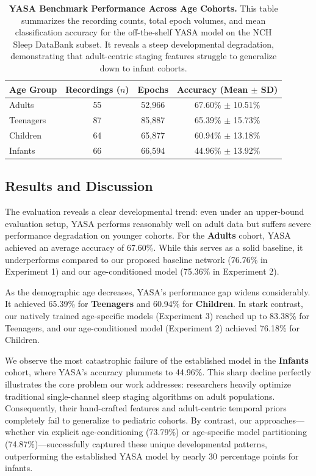 \begin{table}[ht]
\centering
\caption{\textbf{YASA Benchmark Performance Across Age Cohorts.} This table summarizes the recording counts, total epoch volumes, and mean classification accuracy for the off-the-shelf YASA model on the NCH Sleep DataBank subset. It reveals a steep developmental degradation, demonstrating that adult-centric staging features struggle to generalize down to infant cohorts.}
\label{tab:yasa_results}
\begin{tabular}{l c c c}
\toprule
\textbf{Age Group} & \textbf{Recordings ($n$)} & \textbf{Epochs} & \textbf{Accuracy (Mean $\pm$ SD)} \\
\midrule
Adults    & 55 & 52,966 & 67.60\% $\pm$ 10.51\% \\
Teenagers & 87 & 85,887 & 65.39\% $\pm$ 15.73\% \\
Children  & 64 & 65,877 & 60.94\% $\pm$ 13.18\% \\
Infants   & 66 & 66,594 & 44.96\% $\pm$ 13.92\% \\
\bottomrule
\end{tabular}
\end{table}

\subsection{Results and Discussion}
The evaluation reveals a clear developmental trend: even under an upper-bound evaluation setup, YASA performs reasonably well on adult data but suffers severe performance degradation on younger cohorts. For the \textbf{Adults} cohort, YASA achieved an average accuracy of 67.60\%. While this serves as a solid baseline, it underperforms compared to our proposed baseline network (76.76\% in Experiment 1) and our age-conditioned model (75.36\% in Experiment 2). 

As the demographic age decreases, YASA's performance gap widens considerably. It achieved 65.39\% for \textbf{Teenagers} and 60.94\% for \textbf{Children}. In stark contrast, our natively trained age-specific models (Experiment 3) reached up to 83.38\% for Teenagers, and our age-conditioned model (Experiment 2) achieved 76.18\% for Children.

We observe the most catastrophic failure of the established model in the \textbf{Infants} cohort, where YASA's accuracy plummets to 44.96\%. This sharp decline perfectly illustrates the core problem our work addresses: researchers heavily optimize traditional single-channel sleep staging algorithms on adult populations. Consequently, their hand-crafted features and adult-centric temporal priors completely fail to generalize to pediatric cohorts. By contrast, our approaches—whether via explicit age-conditioning (73.79\%) or age-specific model partitioning (74.87\%)—successfully captured these unique developmental patterns, outperforming the established YASA model by nearly 30 percentage points for infants.

